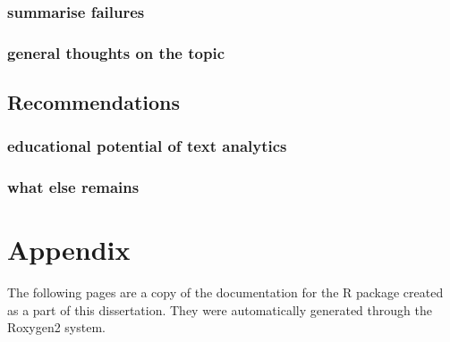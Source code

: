 \documentclass[11pt, a4paper, oneside]{report}
\begin{document}
\subsection{summarise failures}
\subsection{general thoughts on the topic}

\section{Recommendations}
\label{sec:recommendations}

\subsection{educational potential of text analytics}
\subsection{what else remains}

\chapter{Appendix}
\label{cha:appendix}

The following pages are a copy of the documentation for the R package
created as a part of this dissertation. They were automatically
generated through the Roxygen2 system.



{}
\printglossaries
{}
\printindex
{}
\printbibliography
\end{document}
